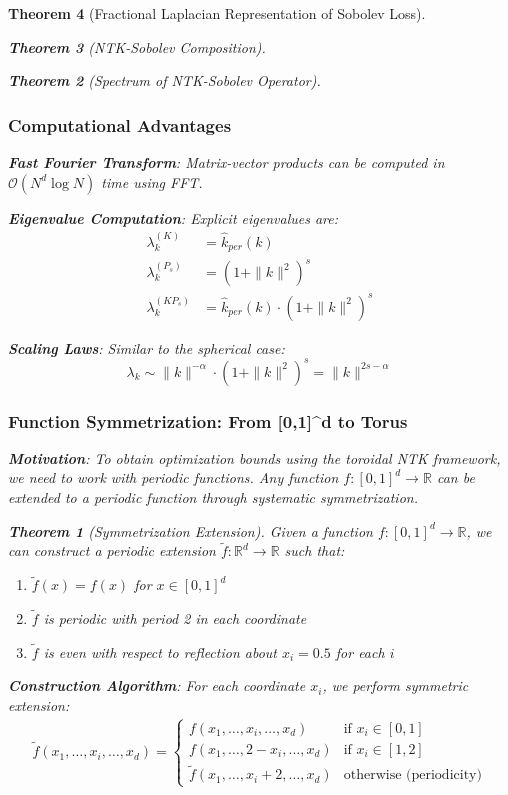 \documentclass{article}
\newtheorem{theorem}{Theorem}[section]
\begin{document}
\begin{theorem}[Fractional Laplacian Representation of Sobolev Loss]
\begin{theorem}[NTK-Sobolev Composition]
\begin{theorem}[Spectrum of NTK-Sobolev Operator]
\subsubsection{Computational Advantages}

\textbf{Fast Fourier Transform}: Matrix-vector products can be computed in $\mathcal{O}(N^d \log N)$ time using FFT.

\textbf{Eigenvalue Computation}: Explicit eigenvalues are:
\begin{align}
\lambda_k^{(K)} &= \hat{k}_{per}(k) \\
\lambda_k^{(P_s)} &= (1 + \|k\|^2)^s \\
\lambda_k^{(KP_s)} &= \hat{k}_{per}(k) \cdot (1 + \|k\|^2)^s
\end{align}

\textbf{Scaling Laws}: Similar to the spherical case:
\[ \lambda_k \sim \|k\|^{-\alpha} \cdot (1 + \|k\|^2)^s = \|k\|^{2s-\alpha} \]

\subsubsection{Function Symmetrization: From [0,1]^d to Torus}

\textbf{Motivation}: To obtain optimization bounds using the toroidal NTK framework, we need to work with periodic functions. Any function $f: [0,1]^d \to \mathbb{R}$ can be extended to a periodic function through systematic symmetrization.

\begin{theorem}[Symmetrization Extension]
Given a function $f: [0,1]^d \to \mathbb{R}$, we can construct a periodic extension $\tilde{f}: \mathbb{R}^d \to \mathbb{R}$ such that:
\begin{enumerate}
\item $\tilde{f}(x) = f(x)$ for $x \in [0,1]^d$
\item $\tilde{f}$ is periodic with period 2 in each coordinate
\item $\tilde{f}$ is even with respect to reflection about $x_i = 0.5$ for each $i$
\end{enumerate}
\end{theorem}

\textbf{Construction Algorithm}:
For each coordinate $x_i$, we perform symmetric extension:
\begin{align}
\tilde{f}(x_1, \ldots, x_i, \ldots, x_d) = \begin{cases}
f(x_1, \ldots, x_i, \ldots, x_d) & \text{if } x_i \in [0,1] \\
f(x_1, \ldots, 2-x_i, \ldots, x_d) & \text{if } x_i \in [1,2] \\
\tilde{f}(x_1, \ldots, x_i + 2, \ldots, x_d) & \text{otherwise (periodicity)}
\end{cases}
\end{align}


\end{theorem}
\end{theorem}
\end{theorem}
\end{document}
